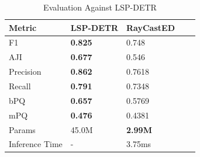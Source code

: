 \begin{table}[htbp]
	\centering
	\caption{Evaluation Against LSP-DETR}
	\label{tab:datasets}
	\begin{tabular}{lllll}
		\hline
		\textbf{Metric} & \textbf{LSP-DETR} & \textbf{RayCastED}  \\
		\hline
		F1 & \textbf{0.825} & 0.748\\
		AJI & \textbf{0.677} & 0.546  \\
		Precision & \textbf{0.862} & 0.7618 \\
		Recall & \textbf{0.791} & 0.7348  \\
		bPQ & \textbf{0.657} & 0.5769  \\
		mPQ & \textbf{0.476} & 0.4381  \\
		\hline
		Params & 45.0M & \textbf{2.99M} \\
		Inference Time & - & 3.75ms \\
		\hline
	\end{tabular}
\end{table}
